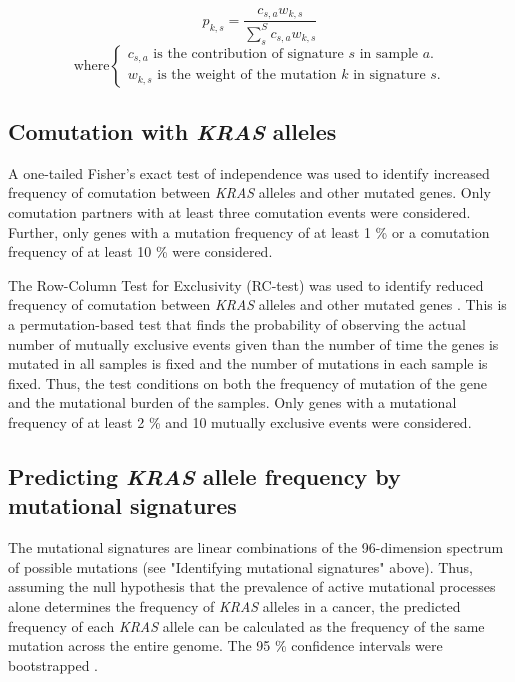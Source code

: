 \documentclass[english, 12pt, letterpaper]{article}
\newcommand{\KRAS}{\emph{KRAS}}
\begin{document}
\begin{equation}
\label{eq:kras_mutation_from_signature}
p_{k,s} = \frac{c_{s,a} w_{k,s}}{\sum_{s}^{S} c_{s,a} w_{k,s}}
\end{equation}
\begin{equation*}
    \text{where} 
    \begin{cases}
        c_{s,a} \text{ is the contribution of signature $s$ in sample $a$.} \\
        w_{k,s} \text{ is the weight of the mutation $k$ in signature $s$.}
    \end{cases}
\end{equation*}


\subsection*{Comutation with \KRAS{} alleles}

A one-tailed Fisher’s exact test of independence was used to identify increased frequency of comutation between \KRAS{} alleles and other mutated genes. Only comutation partners with at least three comutation events were considered. Further, only genes with a mutation frequency of at least 1 \% or a comutation frequency of at least 10 \% were considered. 

The Row-Column Test for Exclusivity (RC-test) was used to identify reduced frequency of comutation between \KRAS{} alleles and other mutated genes \cite{Leiserson2016}. 
This is a permutation-based test that finds the probability of observing the actual number of mutually exclusive events given than the number of time the genes is mutated in all samples is fixed and the number of mutations in each sample is fixed.
Thus, the test conditions on both the frequency of mutation of the gene and the mutational burden of the samples.
Only genes with a mutational frequency of at least 2 \% and 10 mutually exclusive events were considered.


\subsection*{Predicting \KRAS{} allele frequency by mutational signatures}

The mutational signatures are linear combinations of the 96-dimension spectrum of possible mutations (see "Identifying mutational signatures" above).
Thus, assuming the null hypothesis that the prevalence of active mutational processes alone determines the frequency of \KRAS{} alleles in a cancer, the predicted frequency of each \KRAS{} allele can be calculated as the frequency of the same mutation across the entire genome.
The 95 \% confidence intervals were bootstrapped \cite{R-boot}.
\end{document}

